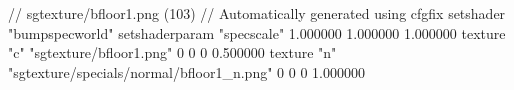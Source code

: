 // sgtexture/bfloor1.png (103)
// Automatically generated using cfgfix
setshader "bumpspecworld"
setshaderparam "specscale" 1.000000 1.000000 1.000000
texture "c" "sgtexture/bfloor1.png" 0 0 0 0.500000
texture "n" "sgtexture/specials/normal/bfloor1_n.png" 0 0 0 1.000000
